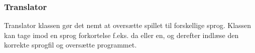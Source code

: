 \subsubsection{Translator}
Translator klassen gør det nemt at oversætte spillet til forskellige sprog. Klassen kan tage imod en sprog forkortelse f.eks. da eller en, og derefter indlæse den korrekte sprogfil og oversætte programmet.
